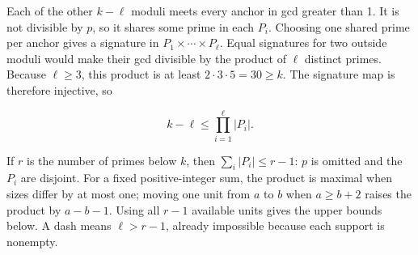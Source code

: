 \documentclass[11pt,a4paper]{article}
\begin{document}
Each of the other \(k-\ell\) moduli meets every anchor in gcd greater than 1. It is not divisible by \(p\), so it shares some prime in each \(P_i\). Choosing one shared prime per anchor gives a signature in \(P_1\times\cdots\times P_\ell\). Equal signatures for two outside moduli would make their gcd divisible by the product of \(\ell\) distinct primes. Because \(\ell\ge3\), this product is at least \(2\cdot3\cdot5=30\ge k\). The signature map is therefore injective, so

\[
  k-\ell\le\prod_{i=1}^{\ell}|P_i|. \tag{1}
\]

If \(r\) is the number of primes below \(k\), then \(\sum_i|P_i|\le r-1\): \(p\) is omitted and the \(P_i\) are disjoint. For a fixed positive-integer sum, the product is maximal when sizes differ by at most one; moving one unit from \(a\) to \(b\) when \(a\ge b+2\) raises the product by \(a-b-1\). Using all \(r-1\) available units gives the upper bounds below. A dash means \(\ell>r-1\), already impossible because each support is nonempty.
\end{document}
